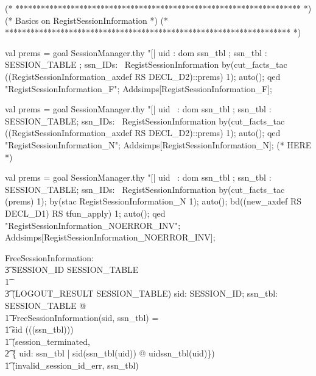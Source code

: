 \documentclass[a4paper,pdftex]{article}
\newenvironment{holz-proof}{\comment}{\endcomment}
\begin{document}
\begin{holz-proof}


(* ******************************************************************* *)
(* Basics on RegistSessionInformation                                  *)
(* ******************************************************************* *)

val prems = goal SessionManager.thy 
"[| uid : dom ssn_tbl ; ssn_tbl : SESSION_TABLE ; ssn_IDs: %
\ RegistSessionInformation %
by(cut_facts_tac ((RegistSessionInformation_axdef RS DECL_D2)::prems) 1);
auto();
qed "RegistSessionInformation_F";
Addsimps[RegistSessionInformation_F];


val prems = goal SessionManager.thy 
"[| uid ~: dom ssn_tbl ; ssn_tbl : SESSION_TABLE; ssn_IDs: %
\ RegistSessionInformation %
by(cut_facts_tac ((RegistSessionInformation_axdef RS DECL_D2)::prems) 1);
auto();
qed "RegistSessionInformation_N";
Addsimps[RegistSessionInformation_N];
(* HERE *)


val prems = goal SessionManager.thy 
"[| uid ~: dom ssn_tbl ; ssn_tbl : SESSION_TABLE; ssn_IDs: %
\ RegistSessionInformation %
by(cut_facts_tac (prems) 1);
by(stac RegistSessionInformation_N 1);
auto();
bd((new_axdef RS DECL_D1) RS tfun_apply) 1;
auto();
qed "RegistSessionInformation_NOERROR_INV";
Addsimps[RegistSessionInformation_NOERROR_INV];


\end{holz-proof}


\begin{axdef}
FreeSessionInformation: \\
\t3 SESSION\_ID \cross SESSION\_TABLE \\
\t1 \fun \\
\t3 (LOGOUT\_RESULT \cross SESSION\_TABLE)
\where
\forall sid: SESSION\_ID; ssn\_tbl: SESSION\_TABLE @ \\
\t1 FreeSessionInformation(sid, ssn\_tbl) = \\
\t1 \IF sid \in \dom (\bigcup (\ran (ssn\_tbl))) \\
\t1 \THEN  (session\_terminated, \\
\t2    \; \{ uid: \dom ssn\_tbl | sid\notin\dom(ssn\_tbl(uid)) @ uid\mapsto ssn\_tbl(uid)\})\\
\t1 \ELSE (invalid\_session\_id\_err, ssn\_tbl)
\end{axdef}
\end{document}
